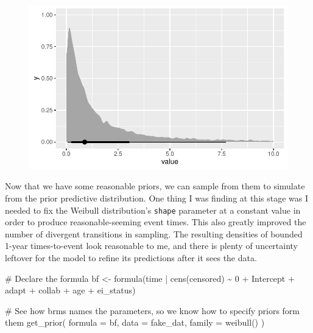 \documentclass[
  letterpaper,
  DIV=11,
  numbers=noendperiod]{scrreprt}
\newenvironment{Shaded}{\begin{snugshade}}{\end{snugshade}}
\newcommand{\AttributeTok}[1]{\textcolor[rgb]{0.40,0.45,0.13}{#1}}
\newcommand{\CommentTok}[1]{\textcolor[rgb]{0.37,0.37,0.37}{#1}}
\newcommand{\DecValTok}[1]{\textcolor[rgb]{0.68,0.00,0.00}{#1}}
\newcommand{\FunctionTok}[1]{\textcolor[rgb]{0.28,0.35,0.67}{#1}}
\newcommand{\NormalTok}[1]{\textcolor[rgb]{0.00,0.23,0.31}{#1}}
\newcommand{\OtherTok}[1]{\textcolor[rgb]{0.00,0.23,0.31}{#1}}
\newcommand{\SpecialCharTok}[1]{\textcolor[rgb]{0.37,0.37,0.37}{#1}}
\begin{document}
\begin{figure}[H]

{\centering \includegraphics{./bayesian-cfa_files/figure-pdf/unnamed-chunk-26-1.pdf}

}

\end{figure}

Now that we have some reasonable priors, we can sample from them to
simulate from the prior predictive distribution. One thing I was finding
at this stage was I needed to fix the Weibull distribution's
\texttt{shape} parameter at a constant value in order to produce
reasonable-seeming event times. This also greatly improved the number of
divergent transitions in sampling. The resulting densities of bounded
1-year times-to-event look reasonable to me, and there is plenty of
uncertainty leftover for the model to refine its predictions after it
sees the data.

\begin{Shaded}
\begin{Highlighting}[]
\CommentTok{\# Declare the formula}
\NormalTok{bf }\OtherTok{\textless{}{-}} \FunctionTok{formula}\NormalTok{(time }\SpecialCharTok{|} \FunctionTok{cens}\NormalTok{(censored) }\SpecialCharTok{\textasciitilde{}} \DecValTok{0} \SpecialCharTok{+}\NormalTok{ Intercept }\SpecialCharTok{+}\NormalTok{ adapt }\SpecialCharTok{+}\NormalTok{ collab }\SpecialCharTok{+}\NormalTok{ age }\SpecialCharTok{+}\NormalTok{ ei\_status)}

\CommentTok{\# See how brms names the parameters, so we know how to specify priors form them}
\FunctionTok{get\_prior}\NormalTok{(}
  \AttributeTok{formula =}\NormalTok{ bf,}
  \AttributeTok{data =}\NormalTok{ fake\_dat,}
  \AttributeTok{family =} \FunctionTok{weibull}\NormalTok{()}
\NormalTok{)}
\end{Highlighting}
\end{Shaded}
\end{document}
